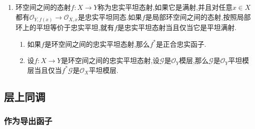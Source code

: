\begin{enumerate}
\begin{proof}
		问题是局部的,不妨设有正合列$\mathscr{O}_Y^p\to\mathscr{O}_Y^q\to\mathscr{F}\to0$,按照$f^*$和$\mathrm{HOM}(\bullet,\mathscr{G})$总是左正合的,利用短五引理,归结为证明$\mathscr{F}=\mathscr{O}_Y$的情况,此时同构是平凡的.
	\end{proof}
	\item 环空间之间的态射$f:X\to Y$称为忠实平坦态射,如果它是满射,并且对任意$x\in X$都有$\mathscr{O}_{Y,f(x)}\to\mathscr{O}_{X,x}$是忠实平坦同态.如果$f$是局部环空间之间的态射,按照局部环上的平坦等价于忠实平坦,就有$f$是忠实平坦态射当且仅当它是平坦满射.
	\begin{enumerate}[(1)]
		\item 如果$f$是环空间之间的忠实平坦态射,那么$f^*$是正合忠实函子.
		\item 设$f:X\to Y$是环空间之间的忠实平坦态射,设$\mathscr{G}$是$\mathscr{O}_Y$模层,那么$\mathscr{G}$是$\mathscr{O}_Y$平坦模层当且仅当$f^*\mathscr{G}$是$\mathscr{O}_X$平坦模层.
	\end{enumerate}
\end{enumerate}
\newpage
\subsection{层上同调}
\subsubsection{作为导出函子}

